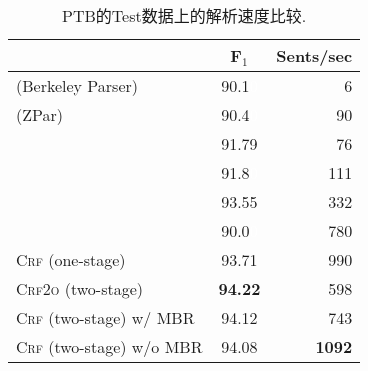 \begin{table}[tb!]
	\centering
	\caption{PTB的Test数据上的解析速度比较.}
	\begin{tabular}{lcr}
		\toprule
		                                                      & F$_1$                    & Sents/sec     \\
		\midrule
		\citet{petrov-klein-2007-improved}  (Berkeley Parser) & 90.1\textcolor{white}{0} & 6             \\
		\citet{zhu-etal-2013-fast} (ZPar)                     & 90.4\textcolor{white}{0} & 90            \\
		\citet{stern-etal-2017-minimal}                       & 91.79                    & 76            \\
		\citet{shen-etal-2018-straight}                       & 91.8\textcolor{white}{0} & 111           \\
		\citet{kitaev-klein-2018-constituency}                & 93.55                    & 332           \\
		\citet{gomez-rodriguez-vilares-2018-constituent}      & 90.0\textcolor{white}{0} & 780           \\[3pt]
		\textsc{Crf} (one-stage)                              & 93.71                    & 990           \\
		\textsc{Crf2o} (two-stage)                            & \textbf{94.22}           & 598           \\
		\textsc{Crf} (two-stage) w/ MBR                       & 94.12                    & 743           \\
		\textsc{Crf} (two-stage) w/o MBR                      & 94.08                    & \textbf{1092} \\
		
		
		\bottomrule
	\end{tabular}
	\label{table:speed}
\end{table}